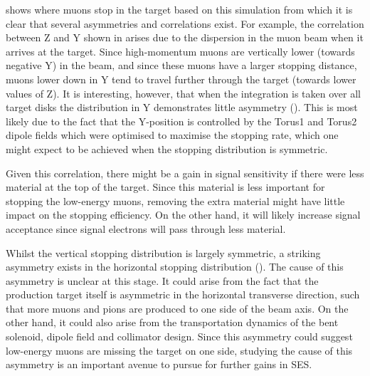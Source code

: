  shows where muons stop in the target based on this simulation from which it is clear that several asymmetries and correlations exist.
For example, the correlation between Z and Y shown in  arises due to the dispersion in the muon beam when it arrives at the target. 
Since high-momentum muons are vertically lower (towards negative Y) in the beam, and since these muons have a larger stopping distance, muons lower down in Y tend to travel further through the target (towards lower values of Z).
It is interesting, however, that when the integration is taken over all target disks the distribution in Y demonstrates little asymmetry (). 
This is most likely due to the fact that the Y-position is controlled by the Torus1 and Torus2 dipole fields which were optimised to maximise the stopping rate, which one might expect to be achieved when the stopping distribution is symmetric.

\FigSensMuStopsTwoD
Given this correlation, there might be a gain in signal sensitivity if there were less material at the top of the target.
Since this material is less important for stopping the low-energy muons, removing the extra material might have little impact on the stopping efficiency.
On the other hand, it will likely increase signal acceptance since signal electrons will pass through less material.

Whilst the vertical stopping distribution is largely symmetric,
a striking asymmetry exists in the horizontal stopping distribution ().
The cause of this asymmetry is unclear at this stage.
It could arise from the fact that the production target itself is asymmetric in the horizontal transverse direction, such that more muons and pions are produced to one side of the beam axis.
On the other hand, it could also arise from the transportation dynamics of the bent solenoid, dipole field and collimator design. 
Since this asymmetry could suggest low-energy muons are missing the target on one side, studying the cause of this asymmetry 
is an important avenue to pursue for further gains in \ac{SES}.


